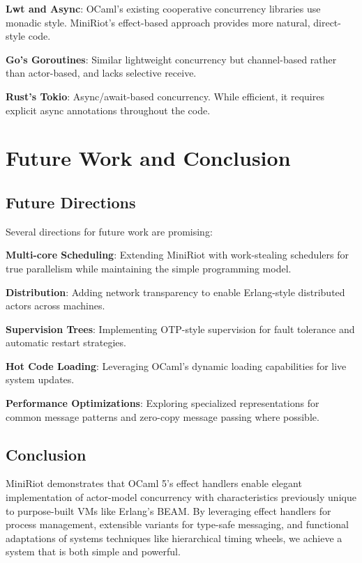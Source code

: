 \documentclass[sigplan,screen]{acmart}
\begin{document}
\textbf{Lwt and Async}: OCaml's existing cooperative concurrency libraries use monadic style. MiniRiot's effect-based approach provides more natural, direct-style code.

\textbf{Go's Goroutines}: Similar lightweight concurrency but channel-based rather than actor-based, and lacks selective receive.

\textbf{Rust's Tokio}: Async/await-based concurrency. While efficient, it requires explicit async annotations throughout the code.

\section{Future Work and Conclusion}

\subsection{Future Directions}

Several directions for future work are promising:

\textbf{Multi-core Scheduling}: Extending MiniRiot with work-stealing schedulers for true parallelism while maintaining the simple programming model.

\textbf{Distribution}: Adding network transparency to enable Erlang-style distributed actors across machines.

\textbf{Supervision Trees}: Implementing OTP-style supervision for fault tolerance and automatic restart strategies.

\textbf{Hot Code Loading}: Leveraging OCaml's dynamic loading capabilities for live system updates.

\textbf{Performance Optimizations}: Exploring specialized representations for common message patterns and zero-copy message passing where possible.

\subsection{Conclusion}

MiniRiot demonstrates that OCaml 5's effect handlers enable elegant implementation of actor-model concurrency with characteristics previously unique to purpose-built VMs like Erlang's BEAM. By leveraging effect handlers for process management, extensible variants for type-safe messaging, and functional adaptations of systems techniques like hierarchical timing wheels, we achieve a system that is both simple and powerful.
\end{document}
